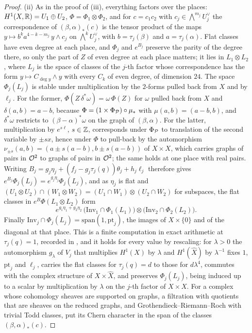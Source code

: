 \begin{proof}
(ii) As in the proof of (iii), everything factors
over the places: $H^{1}(X,\mathbb{R})=U_{1}\oplus U_{2}$, $\Phi=\Phi_{1}\otimes\Phi_{2}$,
and for $c=c_{1}c_{2}$ with $c_{j}\in\bigwedge^{m_{j}}U_{j}^{\vee}$ the
correspondence of $(\beta,\alpha)_{*}(c)$ is the tensor product of the maps
$y\mapsto b^{k}a^{4-k-m_{j}}\,y\wedge c_{j}$ on $\bigwedge^{k}U_{j}^{\vee}$,
with $b=\tau_{j}(\beta)$ and $a=\tau_{j}(\alpha)$. Flat classes have even
degree at each place, and $\Phi_{j}$ and $e^{B_{j}}$ preserve the parity of the
degree there, so only the part of $Z$ of even degree at each place matters;
it lies in $L_{1}\otimes L_{2}$, where $L_{j}$ is the space of classes of the
$j$-th factor whose correspondence has the form $y\mapsto C_{\deg y}\wedge y$
with every $C_{k}$ of even degree, of dimension $24$. The space
$\Phi_{j}(L_{j})$ is stable under multiplication by the $2$-forms pulled back
from $X$ and by $\ell_{j}$. For the former, $\Phi(Z\,\delta^{*}\omega)=
\omega\,\Phi(Z)$ for $\omega$ pulled back from $X$ and $\delta(a,b)=a-b$,
because $\Phi=(1\times\Phi_{\mathcal{P}})\circ\mu_{*}$ with $\mu(a,b)=(a-b,b)$, and
$\delta^{*}\omega$ restricts to $(\beta-\alpha)^{*}\omega$ on the graph of
$(\beta,\alpha)$. For the latter, multiplication by $e^{s\ell}$, $s\in\mathbb{Z}$,
corresponds under $\Phi_{\mathcal{P}}$ to translation of the second variable by $\pm
sx$, hence under $\Phi$ to pull-back by the automorphism
$\nu_{\pm s}(a,b)=(a\pm s(a-b),b\pm s(a-b))$ of $X\times X$, which carries
graphs of pairs in $\mathcal{O}^{2}$ to graphs of pairs in $\mathcal{O}^{2}$; the same holds at
one place with real pairs. Writing
$B_{j}=g_{j}\eta_{j}+(f_{j}-g_{j}\tau_{j}(q))\theta_{j}+h_{j}\ell_{j}$
therefore gives $e^{B_{j}}\Phi_{j}(L_{j})=e^{g_{j}\eta_{j}}\Phi_{j}(L_{j})$, and
as $\eta_{j}$ is flat and $(U_{1}\otimes U_{2})\cap(W_{1}\otimes W_{2})=
(U_{1}\cap W_{1})\otimes(U_{2}\cap W_{2})$ for subspaces, the flat classes in
$e^{B}\Phi(L_{1}\otimes L_{2})$ form
\[
  e^{g_{1}\eta_{1}+g_{2}\eta_{2}}\,
  \bigl(\mathrm{Inv}_{1}\cap\Phi_{1}(L_{1})\bigr)\otimes
  \bigl(\mathrm{Inv}_{2}\cap\Phi_{2}(L_{2})\bigr).
\]
Finally $\mathrm{Inv}_{j}\cap\Phi_{j}(L_{j})=\mathrm{span}(1,\mathrm{pt}_{j})$,
the images of $X\times\{0\}$ and of the diagonal at that place. This is a
finite computation in exact arithmetic at $\tau_{j}(q)=1$, recorded in
\cite{BMB26}, and it holds for every
value by rescaling: for $\lambda>0$ the automorphism $g_{\lambda}$ of $V_{j}$
that multiplies $H^{1}(X)$ by $\lambda$ and $H^{1}(\widehat X)$ by
$\lambda^{-1}$ fixes $1$, $\mathrm{pt}_{j}$ and $\ell_{j}$, carries the flat
classes for $\tau_{j}(q)=d$ to those for $d\lambda^{4}$, commutes with the
complex structure of $X\times\widehat X$, and preserves $\Phi_{j}(L_{j})$,
being induced up to a scalar by multiplication by $\lambda$ on the $j$-th
factor of $X\times X$. For a complex whose cohomology sheaves are supported on
graphs, a filtration with quotients that are sheaves on the reduced graphs,
and Grothendieck--Riemann--Roch with trivial Todd classes, put its Chern
character in the span of the classes $(\beta,\alpha)_{*}(c)$.


\end{proof}
